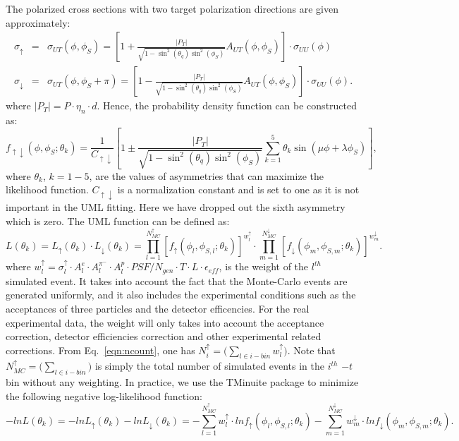 The polarized cross sections with two target polarization directions are given
approximately:
\begin{eqnarray}
     \sigma_{\uparrow} &=& \sigma_{UT}(\phi, \phi_{S}) = [1 +
       \frac{|P_{T}|}{\sqrt{1-\sin^2(\theta_{q})\sin^2(\phi_{S})}} A_{UT}(\phi,
       \phi_{S})] \cdot \sigma_{UU}(\phi) \\
     \sigma_{\downarrow} &=& \sigma_{UT}(\phi, \phi_{S}+\pi) = [1
       -\frac{|P_{T}|}{\sqrt{1-\sin^2(\theta_{q})\sin^2(\phi_{S})}} A_{UT}(\phi,
       \phi_{S})]\cdot \sigma_{UU}(\phi).
\end{eqnarray}
where $|P_{T}| = P\cdot \eta_{n} \cdot d $. Hence, the probability density
function can be constructed as:
\begin{equation}
  f_{\uparrow\downarrow}(\phi, \phi_{S}; \theta_{k}) =
  \frac{1}{C_{\uparrow\downarrow}} [1 \pm
    \frac{|P_{T}|}{\sqrt{1-\sin^2(\theta_{q})\sin^2(\phi_{S})}} \sum_{k=1}^{5}
    \theta_{k} \sin(\mu\phi+\lambda\phi_{S})],
\end{equation}
where $\theta_{k}$, $k=1-5$, are the values of asymmetries that can maximize
the likelihood function.  $C_{\uparrow\downarrow}$ is a normalization constant
and is set to one as it is not important in the UML fitting. Here we have
dropped out the sixth asymmetry which is zero. The UML function can be defined
as:
\begin{equation}
	L(\theta_{k}) = L_{\uparrow}(\theta_{k})\cdot
        L_{\downarrow}(\theta_{k})=\prod_{l=1}^{N_{MC}^{\uparrow}}[f_{\uparrow}(\phi_{l},
          \phi_{S,l};\theta_{k})]^{w^{\uparrow}_{l}}\cdot
        \prod_{m=1}^{N_{MC}^{\downarrow}}[f_{\downarrow}(\phi_{m},
          \phi_{S,m};\theta_{k})]^{w^{\downarrow}_{m}}.
\end{equation}
where $w^{\uparrow}_{l} = \sigma^{\uparrow}_{l}\cdot A^{e}_{l} \cdot
A^{\pi^{-}}_{l} \cdot A^{p}_{l} \cdot PSF/N_{gen} \cdot T \cdot L \cdot
\epsilon_{eff}$, is the weight of the $l^{th}$ simulated event. It takes into
account the fact that the Monte-Carlo events are generated uniformly, and it
also includes the experimental conditions such as the acceptances of three
particles and the detector efficencies. For the real experimental data, the
weight will only takes into account the acceptance correction, detector
efficiencies correction and other experimental related corrections. From
Eq.~\ref{eqn:ncount}, one has $ N^{\uparrow}_{i} = \bigl(\sum_{l\in
  i-bin}w^{\uparrow}_{l})$. Note that $N_{MC}^{\uparrow}= \bigl(\sum_{l\in
  i-bin})$ is simply the total number of simulated events in the $i^{th}$ $-t$
bin without any weighting. In practice, we use the TMinuite package to minimize
the following negative log-likelihood function:
\begin{equation}
  -lnL(\theta_{k}) =-ln
  L_{\uparrow}(\theta_{k})-lnL_{\downarrow}(\theta_{k})=-\sum_{l=1}^{N_{MC}^{\uparrow}}
  w^{\uparrow}_{l}\cdot lnf_{\uparrow}(\phi_{l},
  \phi_{S,l};\theta_{k})-\sum_{m=1}^{N_{MC}^{\downarrow}}
  w^{\downarrow}_{m}\cdot lnf_{\downarrow}(\phi_{m}, \phi_{S,m};\theta_{k}).
\end{equation}


